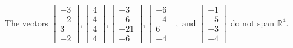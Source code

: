 \begin{exercise}
\begin{exerciseStatement}
  \end{exerciseStatement}
  \begin{exerciseAnswer}
   The vectors \(\left[\begin{array}{r}
-3 \\
-2 \\
3 \\
-2
\end{array}\right] , \left[\begin{array}{r}
4 \\
4 \\
4 \\
4
\end{array}\right] , \left[\begin{array}{r}
-3 \\
-6 \\
-21 \\
-6
\end{array}\right] , \left[\begin{array}{r}
-6 \\
-4 \\
6 \\
-4
\end{array}\right] , \text{ and } \left[\begin{array}{r}
-1 \\
-5 \\
-3 \\
-4
\end{array}\right]\) 
  	 do not  
	span \(\mathbb{R}^4\).
  


  \end{exerciseAnswer}
\end{exercise}